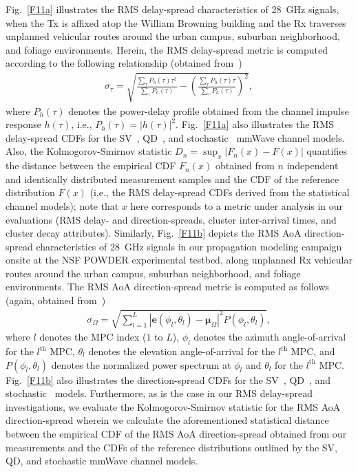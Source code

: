 \documentclass[12pt, draftcls, onecolumn]{IEEEtran}
\begin{document}
{Fig.~\ref{F11a} illustrates the RMS delay-spread characteristics of \SI{28}{\giga\hertz} signals, when the Tx is affixed atop the William Browning building and the Rx traverses unplanned vehicular routes around the urban campus, suburban neighborhood, and foliage environments. Herein, the RMS delay-spread metric is computed according to the following relationship (obtained from~\cite{Indoor60G})
\begin{align}\label{RMS_DS}
    \sigma_{\tau} = \sqrt{\frac{\sum_{\tau}P_{h}(\tau)\tau^{2}}{\sum_{\tau}P_{h}(\tau)} - \left(\frac{\sum_{\tau}P_{h}(\tau)\tau}{\sum_{\tau}P_{h}(\tau)}\right)^{2}},
\end{align}
where $P_{h}(\tau)$ denotes the power-delay profile obtained from the channel impulse response $h(\tau)$, i.e., $P_{h}(\tau){=}|h(\tau)|^{2}$. Fig.~\ref{F11a} also illustrates the RMS delay-spread CDFs for the SV~\cite{SV_Molisch}, QD~\cite{QDC_NIST}, and stochastic~\cite{Indoor60G} mmWave channel models. Also, the Kolmogorov-Smirnov statistic $D_{n}{=}\sup_{x}|F_{n}(x){-}F(x)|$ quantifies the distance between the empirical CDF $F_{n}(x)$ obtained from $n$ independent and identically distributed measurement samples and the CDF of the reference distribution $F(x)$ (i.e., the RMS delay-spread CDFs derived from the statistical channel models); note that $x$ here corresponds to a metric under analysis in our evaluations (RMS delay- and direction-spreads, cluster inter-arrival times, and cluster decay attributes). Similarly, Fig.~\ref{F11b} depicts the RMS AoA direction-spread characteristics of \SI{28}{\giga\hertz} signals in our propagation modeling campaign onsite at the NSF POWDER experimental testbed, along unplanned Rx vehicular routes around the urban campus, suburban neighborhood, and foliage environments. The RMS AoA direction-spread metric is computed as follows (again, obtained from~\cite{Indoor60G})
\begin{align}\label{RMS_DirS}
    \sigma_{\Omega} = \sqrt{\sum_{l=1}^{L}|\mathbf{e}(\phi_{l}, \theta_{l}) - \boldsymbol{\mu}_{\Omega}|^{2}P(\phi_{l}, \theta_{l})},
\end{align}
where $l$ denotes the MPC index ($1$ to $L$), $\phi_{l}$ denotes the azimuth angle-of-arrival for the $l^{\mathrm{th}}$ MPC, $\theta_{l}$ denotes the elevation angle-of-arrival for the $l^{\mathrm{th}}$ MPC, and $P(\phi_{l}, \theta_{l})$ denotes the normalized power spectrum at $\phi_{l}$ and $\theta_{l}$ for the $l^{\mathrm{th}}$ MPC. Fig.~\ref{F11b} also illustrates the direction-spread CDFs for the SV~\cite{SV_Molisch}, QD~\cite{QDC_NIST}, and stochastic~\cite{Indoor60G} models. Furthermore, as is the case in our RMS delay-spread investigations, we evaluate the Kolmogorov-Smirnov statistic for the RMS AoA direction-spread wherein we calculate the aforementioned statistical distance between the empirical CDF of the RMS AoA direction-spread obtained from our measurements and the CDFs of the reference distributions outlined by the SV, QD, and stochastic mmWave channel models.
}
\end{document}
